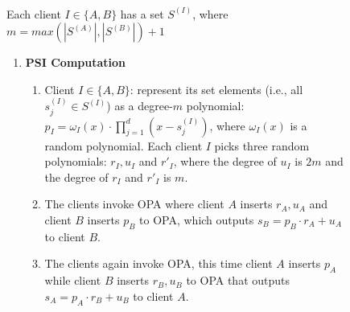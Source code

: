 \begin{figure}[ht]
\setlength{\fboxsep}{1pt}
\begin{center}
\begin{boxedminipage}{12.3cm}

\

Each client $I\in\{A,B\}$ has a set $S^{\scriptscriptstyle (I)}$, where $m=max(|S^{(\scriptscriptstyle A)}|,|S^{(\scriptscriptstyle B)}|)+1$ 

\begin{enumerate}
\item \textbf{PSI Computation}
\begin{enumerate}
\item\label{gen-set-rep} Client $I\in\{A,B\}$: represent its set elements (i.e., all $s^{\scriptscriptstyle (I)}_{\scriptscriptstyle j}\in S^{\scriptscriptstyle (I)}$) as a degree-$m$ polynomial: $p_{\scriptscriptstyle I}=  \omega_{\scriptscriptstyle I}(x)\cdot\prod\limits^{\scriptscriptstyle d}_{\scriptscriptstyle j=1}(x-s^{\scriptscriptstyle (I)}_{\scriptscriptstyle j})$, where  $\omega_{\scriptscriptstyle I}(x)$ is a random polynomial. Each client $I$ picks three random polynomials: $r_{\scriptscriptstyle I}, u_{\scriptscriptstyle I}$ and $r'_{\scriptscriptstyle I}$, where the degree of $u_{\scriptscriptstyle I}$ is $2m$ and the degree of $r_{\scriptscriptstyle I}$ and $r'_{\scriptscriptstyle I}$ is $m$.


\item\label{first-OPA-invocation} The clients   invoke  OPA where  client $A$ inserts $r_{\scriptscriptstyle A}, u_{\scriptscriptstyle A}$ and client $B$ inserts $p_{\scriptscriptstyle B}$ to OPA, which outputs  $s_{\scriptscriptstyle B}=p_{\scriptscriptstyle B}\cdot r_{\scriptscriptstyle A}+u_{\scriptscriptstyle A}$ to client $B$. 



\item\label{2nd-OPA-invocation} The clients again invoke OPA, this time client $A$ inserts $p_{\scriptscriptstyle A}$ while client $B$ inserts $r_{\scriptscriptstyle B}, u_{\scriptscriptstyle B}$ to OPA that outputs $s_{\scriptscriptstyle A}=p_{\scriptscriptstyle A}\cdot r_{\scriptscriptstyle B}+u_{\scriptscriptstyle B}$ to client $A$. 


\end{enumerate}
\end{enumerate}
\end{boxedminipage}
\end{center}
\end{figure}

